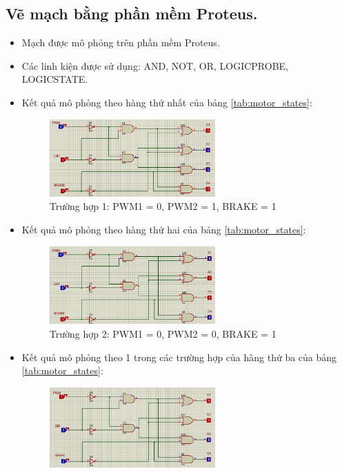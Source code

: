     \subsection{Vẽ mạch bằng phần mềm Proteus.}
        \begin{itemize}
            \item Mạch được mô phỏng trên phần mềm Proteus.
            \item Các linh kiện được sử dụng: AND, NOT, OR, LOGICPROBE, LOGICSTATE. 
            \item Kết quả mô phỏng theo hàng thứ nhất của bảng \ref{tab:motor_states}:
                \begin{figure}[H]
                    \centering
                    \includegraphics[width=0.6\textwidth]{pictures/3_result1.png}
                    \caption{Trường hợp 1: PWM1 = 0, PWM2 = 1, BRAKE = 1}
                \end{figure} 
            \item Kết quả mô phỏng theo hàng thứ hai của bảng \ref{tab:motor_states}:
                 \begin{figure}[H]
                    \centering
                    \includegraphics[width=0.6\textwidth]{pictures/3_result2.png}
                    \caption{Trường hợp 2: PWM1 = 0, PWM2 = 0, BRAKE = 1}
                \end{figure}
            \item Kết quả mô phỏng theo 1 trong các trường hợp của hàng thứ ba của bảng \ref{tab:motor_states}:
                \begin{figure}[H]
                    \centering
                    \includegraphics[width=0.6\textwidth]{pictures/3_result3.png}

\end{figure}
\end{itemize}
